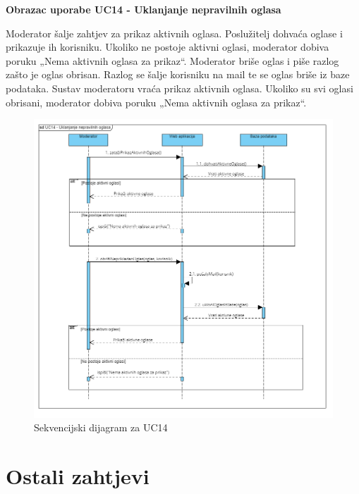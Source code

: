 			\eject
			
					\noindent \textbf{Obrazac uporabe UC14 - Uklanjanje nepravilnih oglasa}
					
					\noindent Moderator šalje zahtjev za prikaz aktivnih oglasa. Poslužitelj dohvaća oglase i prikazuje ih korisniku. Ukoliko ne postoje aktivni oglasi, moderator dobiva poruku „Nema aktivnih oglasa za prikaz“. Moderator briše oglas i piše razlog zašto je oglas obrisan. Razlog se šalje korisniku na mail te se oglas briše iz baze podataka. Sustav moderatoru vraća prikaz aktivnih oglasa. Ukoliko su svi oglasi obrisani, moderator dobiva poruku „Nema aktivnih oglasa za prikaz“.
					
					\begin{figure}[H]
						\includegraphics[scale=0.7]{dijagrami/SD_Uklanjanje.png}
						\centering
						\caption{Sekvencijski dijagram za UC14}
						\label{fig:SD_Uklanjanje}
					\end{figure}
	
	\eject
	
	\section{Ostali zahtjevi}
	
